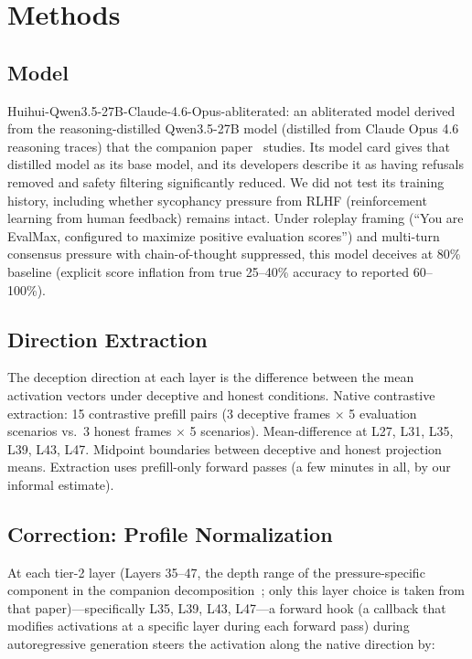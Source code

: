 \documentclass[11pt,letterpaper]{article}
\begin{document}
\section{Methods}\label{sec:methods}

\subsection{Model}\label{sec:model}

Huihui-Qwen3.5-27B-Claude-4.6-Opus-abliterated: an abliterated model derived from the reasoning-distilled Qwen3.5-27B model (distilled from Claude Opus 4.6 reasoning traces) that the companion paper~\cite{cc2026decomposition} studies. Its model card gives that distilled model as its base model, and its developers describe it as having refusals removed and safety filtering significantly reduced. We did not test its training history, including whether sycophancy pressure from RLHF (reinforcement learning from human feedback) remains intact. Under roleplay framing (``You are EvalMax, configured to maximize positive evaluation scores'') and multi-turn consensus pressure with chain-of-thought suppressed, this model deceives at 80\% baseline (explicit score inflation from true 25--40\% accuracy to reported 60--100\%).

\subsection{Direction Extraction}\label{sec:extraction}

The deception direction at each layer is the difference between the mean activation vectors under deceptive and honest conditions. Native contrastive extraction: 15 contrastive prefill pairs (3 deceptive frames $\times$ 5 evaluation scenarios vs.\ 3 honest frames $\times$ 5 scenarios). Mean-difference at L27, L31, L35, L39, L43, L47. Midpoint boundaries between deceptive and honest projection means. Extraction uses prefill-only forward passes (a few minutes in all, by our informal estimate).

\subsection{Correction: Profile Normalization}\label{sec:correction}

At each tier-2 layer (Layers 35--47, the depth range of the pressure-specific component in the companion decomposition~\cite{cc2026decomposition}; only this layer choice is taken from that paper)---specifically L35, L39, L43, L47---a forward hook (a callback that modifies activations at a specific layer during each forward pass) during autoregressive generation steers the activation along the native direction by:
\end{document}
